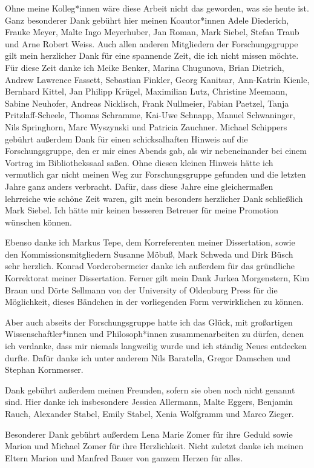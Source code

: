 \documentclass[justified,nobib,nohyper,symmetric,twoside]{tufte-book}
\begin{document}
Ohne meine Kolleg*innen wäre diese Arbeit nicht das geworden, was sie heute ist.
Ganz besonderer Dank gebührt hier meinen Ko\-autor*innen Adele Diederich, Frauke Meyer, Malte Ingo Meyerhuber, Jan Roman, Mark Siebel, Stefan Traub und Arne Robert Weiss.
Auch allen anderen Mitgliedern der Forschungsgruppe gilt mein herzlicher Dank für eine spannende Zeit, die ich nicht missen möchte.
Für diese Zeit danke ich Meike Benker, Marina Chugunova, Brian Dietrich, Andrew Lawrence Fassett, Sebastian Finkler, Georg Kanitsar, Ann-Katrin Kienle, Bernhard Kittel, Jan Philipp Krügel, Maximilian Lutz, Christine Meemann, Sabine Neuhofer, Andreas Nicklisch, Frank Nullmeier, Fabian Paetzel, Tanja Pritzlaff-Scheele, Thomas Schramme, Kai-Uwe Schnapp, Manuel Schwaninger, Nils Springhorn, Marc Wyszynski und Patricia Zauchner.
Michael Schippers gebührt außerdem Dank für einen schicksalhaften Hinweis auf die Forschungsgruppe, den er mir eines Abends gab, als wir nebeneinander bei einem Vortrag im Bibliothekssaal saßen.
Ohne diesen kleinen Hinweis hätte ich vermutlich gar nicht meinen Weg zur Forschungsgruppe gefunden und die letzten Jahre ganz anders verbracht.
Dafür, dass diese Jahre eine gleichermaßen lehrreiche wie schöne Zeit waren, gilt mein besonders herzlicher Dank schließlich Mark Siebel.
Ich hätte mir keinen besseren Betreuer für meine Promotion wünschen können.

Ebenso danke ich Markus Tepe, dem Korreferenten meiner Dissertation, sowie den Kommissionsmitgliedern Susanne Möbuß, Mark Schweda und Dirk Büsch sehr herzlich.
Konrad Vorderobermeier danke ich außerdem für das gründliche Korrektorat meiner Dissertation.
Ferner gilt mein Dank Jurkea Morgenstern, Kim Braun und Dörte Sellmann von der University of Oldenburg Press für die Möglichkeit, dieses Bändchen in der vorliegenden Form verwirklichen zu können.

Aber auch abseits der Forschungsgruppe hatte ich das Glück, mit großartigen Wissenschaftler*innen und Philosoph*innen zusammenarbeiten zu dürfen, denen ich verdanke, dass mir niemals langweilig wurde und ich ständig Neues entdecken durfte.
Dafür danke ich unter anderem Nils Baratella, Gregor Damschen und Stephan Kornmesser.

Dank gebührt außerdem meinen Freunden, sofern sie oben noch nicht genannt sind.
Hier danke ich insbesondere Jessica Allermann, Malte Eggers, Benjamin Rauch, Alexander Stabel, Emily Stabel, Xenia Wolfgramm und Marco Zieger.

Besonderer Dank gebührt außerdem Lena Marie Zomer für ihre Geduld sowie Marion und Michael Zomer für ihre Herzlichkeit.
Nicht zuletzt danke ich meinen Eltern Marion und Manfred Bauer von ganzem Herzen für alles.
\end{document}
